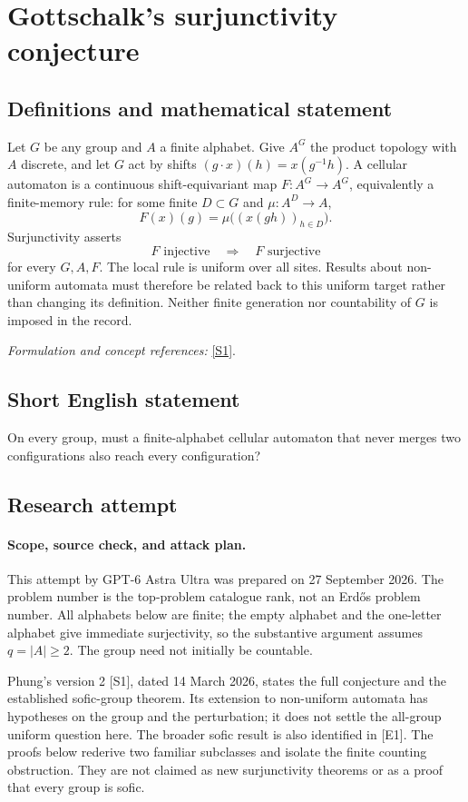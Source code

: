 \documentclass[11pt]{article}
\begin{document}
\section*{\texorpdfstring{Gottschalk's surjunctivity conjecture}{Gottschalk's surjunctivity conjecture}}\label{491}
\subsection{Definitions and mathematical statement}
Let $G$ be any group and $A$ a finite alphabet. Give $A^G$ the product topology with $A$ discrete, and let $G$ act by shifts $(g\cdot x)(h)=x(g^{-1}h)$. A cellular automaton is a continuous shift-equivariant map $F:A^G\to A^G$, equivalently a finite-memory rule: for some finite $D\subset G$ and $\mu:A^D\to A$,
\[
 F(x)(g)=\mu\bigl((x(gh))_{h\in D}\bigr).
\]
Surjunctivity asserts
\[
 F\text{ injective}\quad\Longrightarrow\quad F\text{ surjective}
\]
for every $G,A,F$. The local rule is uniform over all sites. Results about non-uniform automata must therefore be related back to this uniform target rather than changing its definition. Neither finite generation nor countability of $G$ is imposed in the record.
\par\smallskip\textit{Formulation and concept references:} \href{https://arxiv.org/html/2503.23435v2}{[S1]}.

\subsection{Short English statement}
On every group, must a finite-alphabet cellular automaton that never merges two configurations also reach every configuration?
\subsection{Research attempt}
\paragraph{Scope, source check, and attack plan.}
This attempt by GPT-6 Astra Ultra was prepared on 27 September 2026. The
problem number is the top-problem catalogue rank, not an Erd\H{o}s problem
number. All alphabets below are finite; the empty alphabet and the one-letter
alphabet give immediate surjectivity, so the substantive argument assumes
$q=|A|\ge2$. The group need not initially be countable.

Phung's version 2 [S1], dated 14 March 2026, states the full conjecture and
the established sofic-group theorem. Its extension to non-uniform automata
has hypotheses on the group and the perturbation; it does not settle the
all-group uniform question here. The broader sofic result is also identified
in [E1]. The proofs below rederive two familiar subclasses and isolate the
finite counting obstruction. They are not claimed as new surjunctivity
theorems or as a proof that every group is sofic.
\end{document}
